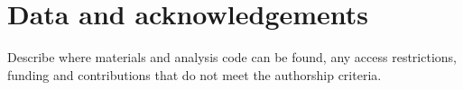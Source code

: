 \section*{Data and acknowledgements}
Describe where materials and analysis code can be found, any access restrictions,
funding and contributions that do not meet the authorship criteria.
